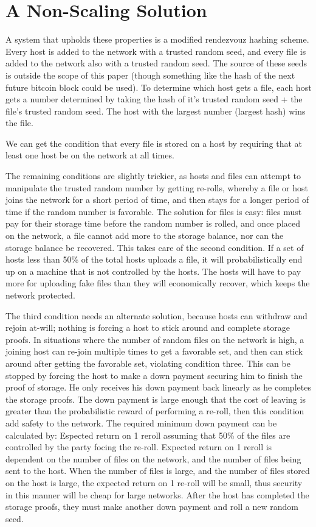 \documentclass[twocolumn]{article}
\begin{document}
\section{A Non-Scaling Solution}
A system that upholds these properties is a modified rendezvouz hashing scheme.
Every host is added to the network with a trusted random seed, and every file is added to the network also with a trusted random seed.
The source of these seeds is outside the scope of this paper (though something like the hash of the next future bitcoin block could be used).
To determine which host gets a file, each host gets a number determined by taking the hash of it's trusted random seed + the file's trusted random seed.
The host with the largest number (largest hash) wins the file.

We can get the condition that every file is stored on a host by requiring that at least one host be on the network at all times.

The remaining conditions are slightly trickier, as hosts and files can attempt to manipulate the trusted random number by getting re-rolls, whereby a file or host joins the network for a short period of time, and then stays for a longer period of time if the random number is favorable.
The solution for files is easy: files must pay for their storage time before the random number is rolled, and once placed on the network, a file cannot add more to the storage balance, nor can the storage balance be recovered.
This takes care of the second condition.
If a set of hosts less than 50\% of the total hosts uploads a file, it will probabilistically end up on a machine that is not controlled by the hosts.
The hosts will have to pay more for uploading fake files than they will economically recover, which keeps the network protected.

The third condition needs an alternate solution, because hosts can withdraw and rejoin at-will; nothing is forcing a host to stick around and complete storage proofs.
In situations where the number of random files on the network is high, a joining host can re-join multiple times to get a favorable set, and then can stick around after getting the favorable set, violating condition three.
This can be stopped by forcing the host to make a down payment securing him to finish the proof of storage.
He only receives his down payment back linearly as he completes the storage proofs.
The down payment is large enough that the cost of leaving is greater than the probabilistic reward of performing a re-roll, then this condition add safety to the network.
The required minimum down payment can be calculated by:
Espected return on 1 reroll assuming that 50\% of the files are controlled by the party focing the re-roll.
Expected return on 1 reroll is dependent on the number of files on the network, and the number of files being sent to the host.
When the number of files is large, and the number of files stored on the host is large, the expected return on 1 re-roll will be small, thus security in this manner will be cheap for large networks.
After the host has completed the storage proofs, they must make another down payment and roll a new random seed.
\end{document}
